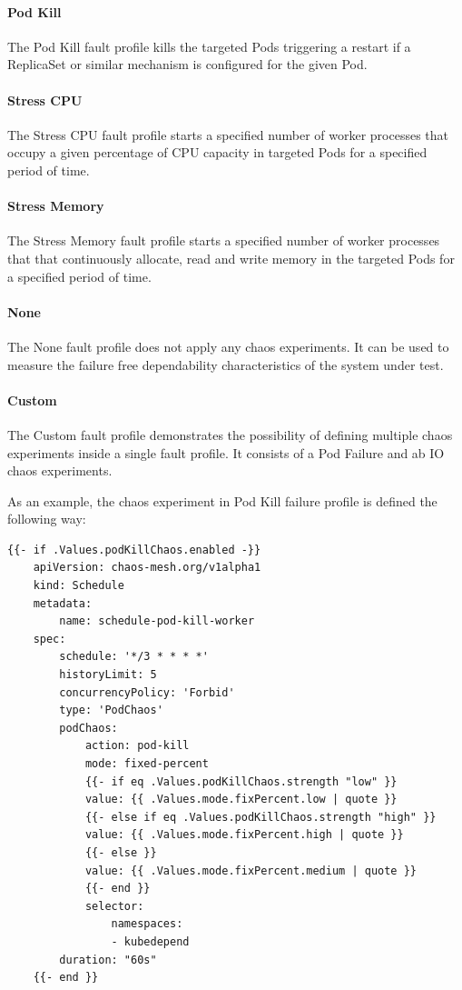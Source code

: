 \paragraph{Pod Kill} The Pod Kill fault profile kills the targeted Pods triggering a restart if a ReplicaSet or similar mechanism is configured for the given Pod.

\paragraph{Stress CPU} The Stress CPU fault profile starts a specified number of worker processes that occupy a given percentage of CPU capacity in targeted Pods for a specified period of time.

\paragraph{Stress Memory} The Stress Memory fault profile starts a specified number of worker processes that that continuously allocate, read and write memory in the targeted Pods for a specified period of time.

\paragraph{None} The None fault profile does not apply any chaos experiments. It can be used to measure the failure free dependability characteristics of the system under test.

\paragraph{Custom} The Custom fault profile demonstrates the possibility of defining multiple chaos experiments inside a single fault profile. It consists of a Pod Failure and ab IO chaos experiments.

As an example, the chaos experiment in Pod Kill failure profile is defined the following way:

\vspace{0.5cm}
\begin{minipage}{\linewidth}
	\begin{lstlisting}[caption={Pod Kill chaos}, label={lst:pod-kill-chaos}]
	{{- if .Values.podKillChaos.enabled -}}
	apiVersion: chaos-mesh.org/v1alpha1
	kind: Schedule
	metadata:
		name: schedule-pod-kill-worker
	spec:
		schedule: '*/3 * * * *'
		historyLimit: 5
		concurrencyPolicy: 'Forbid'
		type: 'PodChaos'
		podChaos:
			action: pod-kill
			mode: fixed-percent
			{{- if eq .Values.podKillChaos.strength "low" }}
			value: {{ .Values.mode.fixPercent.low | quote }}
			{{- else if eq .Values.podKillChaos.strength "high" }}
			value: {{ .Values.mode.fixPercent.high | quote }}
			{{- else }}
			value: {{ .Values.mode.fixPercent.medium | quote }}
			{{- end }}
			selector:
				namespaces:
				- kubedepend
		duration: "60s"
	{{- end }}\end{lstlisting}
\end{minipage}

